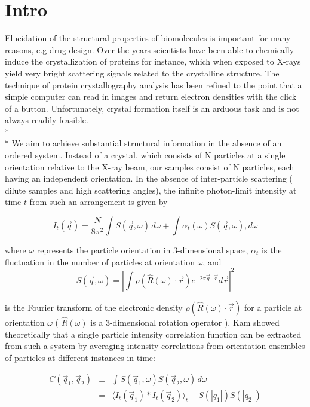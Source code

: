 \documentclass[a4paper,12pt]{article}
\begin{document}
\section*{Intro}
Elucidation of the structural properties of biomolecules is important for many reasons, e.g drug design. Over the years scientists have been able to chemically induce the crystallization of proteins for instance, which when exposed to X-rays yield very bright scattering signals related to the crystalline structure. The technique of protein crystallography analysis has been refined to the point that a simple computer can read in images and return electron densities with the click of a button. Unfortunately, crystal formation itself is an arduous task and is not always readily feasible.
\\*
\\*
We aim to achieve substantial structural information in the absence of an ordered system. Instead of a crystal, which consists of N particles at a single orientation relative to the X-ray beam, our samples consist of N particles, each having an independent orientation. In the absence of inter-particle scattering ( dilute samples and high scattering angles), the infinite photon-limit intensity at time $t$ from such an arrangement is given by 

\begin{equation}
I_{t}( \vec{q} ) = \frac{N}{8\pi^{2}}\int S( \vec{q},\omega ) \, d \omega + \int \alpha_{t}( \omega ) S( \vec{q},\omega ) , d \omega   
\end{equation} 

\noindent where $\omega$ represents the particle orientation in 3-dimensional space, $\alpha_{t}$ is the fluctuation in the number of particles at orientation $\omega$, and 
\begin{equation}
S(\vec{q},\omega) = | \int \rho (\hat{R}(\omega)\cdot \vec{r} ) e^ { -2\pi \vec{q} \cdot \vec{r} } d\vec{r} | ^{2}
\end{equation}

\noindent is the Fourier transform of the electronic density $\rho(\hat{R}(\omega)\cdot \vec{r} ) $ for a particle at orientation $\omega$ ( $\hat{R}(\omega)$ is a 3-dimensional rotation operator ). Kam showed theoretically that a single particle intensity correlation function can be extracted from such a system by averaging intensity correlations from orientation ensembles of particles at different instances in time:

\begin{eqnarray} \label{KAM}
C( \vec{q}_{1}, \vec{q}_{2} ) &\equiv& \int S( \vec{q}_{1},\omega ) S( \vec{q}_{2},\omega ) \, d \omega \nonumber \\
&=&\langle I_{t}( \vec{q}_{1}) * I_{t}(\vec{q}_{2}) \rangle_{t}  - S(|q_{1}| )S(|q_{2}|)
\end{eqnarray}
\end{document}
